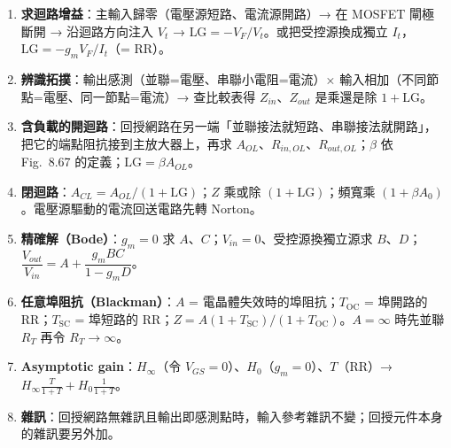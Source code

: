 \documentclass[11pt,a4paper]{article}
\newcommand{\Tsc}{T_{\text{SC}}}
\newcommand{\Toc}{T_{\text{OC}}}
\begin{document}
\begin{recipebox}[解題流程總整理]
\begin{enumerate}[leftmargin=2.2em]
  \item \textbf{求迴路增益}：主輸入歸零（電壓源短路、電流源開路）→ 在 MOSFET 閘極斷開 → 沿迴路方向注入 $V_t$ → $\text{LG}=-V_F/V_t$。或把受控源換成獨立 $I_t$，$\text{LG}=-g_mV_F/I_t$（= RR）。
  \item \textbf{辨識拓撲}：輸出感測（並聯=電壓、串聯小電阻=電流）× 輸入相加（不同節點=電壓、同一節點=電流）→ 查比較表得 $Z_{in}$、$Z_{out}$ 是乘還是除 $1+\text{LG}$。
  \item \textbf{含負載的開迴路}：回授網路在另一端「並聯接法就短路、串聯接法就開路」，把它的端點阻抗接到主放大器上，再求 $A_{OL}$、$R_{in,OL}$、$R_{out,OL}$；$\beta$ 依 Fig.~8.67 的定義；$\text{LG}=\beta A_{OL}$。
  \item \textbf{閉迴路}：$A_{CL}=A_{OL}/(1+\text{LG})$；$Z$ 乘或除 $(1+\text{LG})$；頻寬乘 $(1+\beta A_0)$。電壓源驅動的電流回送電路先轉 Norton。
  \item \textbf{精確解（Bode）}：$g_m=0$ 求 $A$、$C$；$V_{in}=0$、受控源換獨立源求 $B$、$D$；$\dfrac{V_{out}}{V_{in}}=A+\dfrac{g_mBC}{1-g_mD}$。
  \item \textbf{任意埠阻抗（Blackman）}：$A$ = 電晶體失效時的埠阻抗；$\Toc$ = 埠開路的 RR；$\Tsc$ = 埠短路的 RR；$Z=A(1+\Tsc)/(1+\Toc)$。$A=\infty$ 時先並聯 $R_T$ 再令 $R_T\to\infty$。
  \item \textbf{Asymptotic gain}：$H_\infty$（令 $V_{GS}=0$）、$H_0$（$g_m=0$）、$T$（RR）→ $H_\infty\frac{T}{1+T}+H_0\frac{1}{1+T}$。
  \item \textbf{雜訊}：回授網路無雜訊且輸出即感測點時，輸入參考雜訊不變；回授元件本身的雜訊要另外加。
\end{enumerate}
\end{recipebox}
\end{document}
